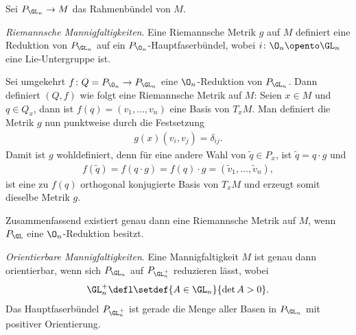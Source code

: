 \documentclass[%
	paper=a5,%
	fleqn,%
	DIV=18,%
	BCOR=0mm,
	fontsize=11pt,
	titlepage=false,%
	bibliography=totoc,
	DIV=18,%
	twoside=true,
	pdftitle=Riemannsche Geometrie,
	pdfauthor=Uwe Semmelmann,
	numbers=noendperiod]%
	{scrbook}
\begin{document}
\begin{ex}
Sei $P_{\GL_n}\to M$ das Rahmenbündel von $M$.
\begin{exenum}
\item \textit{Riemannsche Mannigfaltigkeiten}. Eine Riemannsche Metrik $g$ auf
$M$ definiert eine Reduktion von $P_{\GL_n}$ auf ein
$P_{\O_n}$-Hauptfaserbündel, wobei $i\colon \O_n\opento \GL_n$ eine Lie-Untergruppe
ist.

{
\centering
{}

}

Sei umgekehrt $f\colon Q = P_{\O_n} \to P_{\GL_n}$ eine $\O_n$-Reduktion von
$P_{\GL_n}$. Dann definiert $(Q,f)$ wie folgt eine Riemannsche Metrik auf
$M$: Seien $x\in M$ und $q\in Q_x$, dann ist $f(q) = (v_1,\ldots,v_n)$ eine
Basis von $T_xM$. Man definiert die Metrik $g$ nun punktweise durch die
Festsetzung
\begin{align*}
g(x)(v_i,v_j) = \delta_{ij}.
\end{align*}
Damit ist $g$ wohldefiniert, denn für eine andere Wahl von $\tilde{q}\in P_x$,
ist $\tilde{q} = q\cdot g$ und
\begin{align*}
f(\tilde{q}) = f(q\cdot g) = f(q)\cdot g = (\tilde{v}_1,\ldots,\tilde{v}_n),
\end{align*}
ist eine zu $f(q)$ orthogonal konjugierte Basis von $T_xM$ und erzeugt somit
dieselbe Metrik $g$.

Zusammenfassend existiert genau dann eine Riemannsche Metrik auf $M$, wenn
$P_{\GL}$ eine $\O_n$-Reduktion besitzt.
\item \textit{Orientierbare Mannigfaltigkeiten}. Eine Mannigfaltigkeit $M$ ist
genau dann orientierbar, wenn sich $P_{\GL_n}$ auf $P_{\GL_n^+}$ reduzieren
lässt, wobei
\begin{align*}
\GL_n^+\defl \setdef{A\in\GL_n}{\det A > 0}.
\end{align*}
Das Hauptfaserbündel $P_{\GL_n^+}$ ist gerade die Menge aller Basen in
$P_{\GL_n}$ mit positiver Orientierung.


\end{exenum}
\end{ex}
\end{document}
